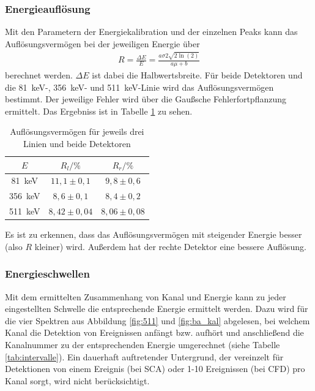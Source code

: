 \subsubsection{Energieauflösung}
Mit den Parametern der Energiekalibration und der einzelnen Peaks kann das Auflösungsvermögen bei der jeweiligen Energie über
\begin{align*}
  R=\frac{\Delta E}{E}=\frac{a\sigma 2\sqrt{2\ln(2)}}{a\mu+b}
\end{align*}
berechnet werden. $\Delta E$ ist dabei die Halbwertsbreite. Für beide Detektoren und die \SI{81}{\kilo\electronvolt}-, \SI{356}{\kilo\electronvolt}- und \SI{511}{\kilo\electronvolt}-Linie wird das Auflösungsvermögen bestimmt. Der jeweilige Fehler wird über die Gaußsche Fehlerfortpflanzung ermittelt. Das Ergebniss ist in Tabelle \ref{tab:aufloesungsvermoegen} zu sehen. \\
\begin{table}[h]
\centering
\caption{Auflösungsvermögen für jeweils drei Linien und beide Detektoren}
\label{tab:aufloesungsvermoegen}
\begin{tabular}{ccc}
\toprule
$E$ & $R_l/\%$ & $R_r/\%$\\
\midrule
\SI{81}{\kilo\electronvolt} & $11,1 \pm 0,1$ &$9,8 \pm 0,6$\\
\SI{356}{\kilo\electronvolt} & $8,6 \pm 0,1$ &$8,4 \pm 0,2$\\
\SI{511}{\kilo\electronvolt} & $8,42 \pm 0,04$ &$8,06 \pm 0,08$\\
\bottomrule
\end{tabular}
\end{table}

Es ist zu erkennen, dass das Auflösungsvermögen mit steigender Energie besser (also $R$ kleiner) wird. Außerdem hat der rechte Detektor eine bessere Auflösung.

\subsubsection{Energieschwellen}
Mit dem ermittelten Zusammenhang von Kanal und Energie kann zu jeder eingestellten Schwelle die entsprechende Energie ermittelt werden. Dazu wird für die vier Spektren aus Abbildung \ref{fig:511} und \ref{fig:ba_kal} abgelesen, bei welchem Kanal die Detektion von Ereignissen anfängt bzw. aufhört und anschließend die Kanalnummer zu der entsprechenden Energie umgerechnet (siehe Tabelle \ref{tab:intervalle}). Ein dauerhaft auftretender Untergrund, der vereinzelt für Detektionen von einem Ereignis (bei SCA) oder 1-10 Ereignissen (bei CFD) pro Kanal sorgt, wird nicht berücksichtigt. \\


